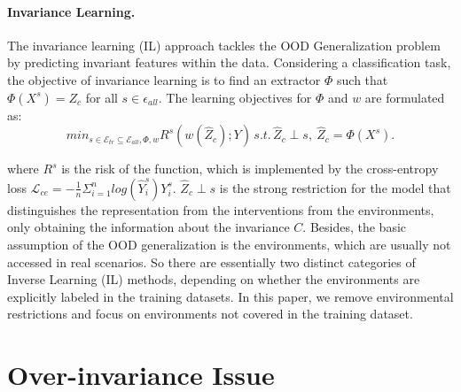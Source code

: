 \paragraph{Invariance Learning.}
 The invariance learning (IL) approach tackles the OOD Generalization problem by predicting invariant features within the data. 
 Considering a classification task, 
 the objective of invariance learning is to find an extractor $\Phi$ such that $\Phi(X^s)=Z_c$ for all $s\in \epsilon_{all}$. The learning objectives for $\Phi$ and $w$ are formulated as:
\begin{equation}
min_{s\in \mathcal{E}_{tr}\subseteq\mathcal{E}_{all},\Phi,w}R^s(w(\hat{Z}_c);Y) \,
s.t.\, \hat{Z}_c \perp s,\ \hat{Z}_c=\Phi(X^s).
\end{equation}

where $R^s$ is the risk of the function, which is implemented by the cross-entropy loss $\mathcal{L}_{ce}=-\frac{1}{n}\Sigma_{i=1}^nlog(\hat{Y}_i^s)Y_i^s$.
$\hat{Z}_c \perp s$ is the strong restriction for the model that distinguishes the representation from the interventions from the environments, only obtaining the information about the invariance $C$.
Besides, the basic assumption of the OOD generalization is the environments, which are usually not accessed in real scenarios. 
So there are essentially two distinct categories of Inverse Learning (IL) methods, depending on whether the environments are explicitly labeled in the training datasets.
In this paper, we remove environmental restrictions and focus on environments not covered in the training dataset.



\section{Over-invariance Issue}
\label{sec: understand}

